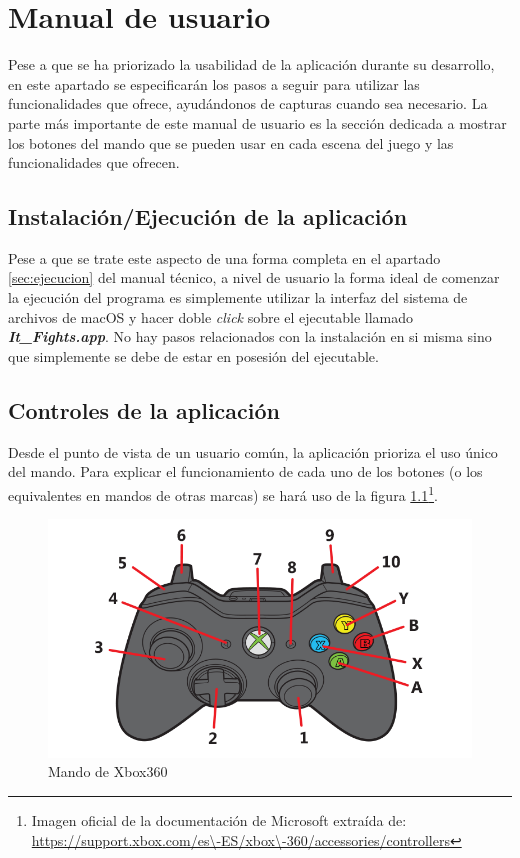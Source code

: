 \chapter{Manual de usuario}

Pese a que se ha priorizado la usabilidad de la aplicación durante su desarrollo, en este apartado se especificarán los pasos a seguir para utilizar las funcionalidades que ofrece, ayudándonos de capturas cuando sea necesario. La parte más importante de este manual de usuario es la sección dedicada a mostrar los botones del mando que se pueden usar en cada escena del juego y las funcionalidades que ofrecen.

\section{Instalación/Ejecución de la aplicación}

Pese a que se trate este aspecto de una forma completa en el apartado \ref{sec:ejecucion} del manual técnico, a nivel de usuario la forma ideal de comenzar la ejecución del programa es simplemente utilizar la interfaz del sistema de archivos de macOS y hacer doble \textit{click} sobre el ejecutable llamado \textbf{\textit{It\_Fights.app}}. No hay pasos relacionados con la instalación en si misma sino que simplemente se debe de estar en posesión del ejecutable.


\section{Controles de la aplicación}
\label{sec:controles}
Desde el punto de vista de un usuario común, la aplicación prioriza el uso único del mando. Para explicar el funcionamiento de cada uno de los botones (o los equivalentes en mandos de otras marcas) se hará uso de la figura \ref{controles:mando}\footnote{Imagen oficial de la documentación de Microsoft extraída de: \\ \url{https://support.xbox.com/es\-ES/xbox\-360/accessories/controllers}}.

\begin{figure}
	\centerline{\includegraphics[width=12cm]{otros/graphicalInterface/mando.png}}
	\caption{Mando de Xbox360}
	\label{controles:mando}
\end{figure}

